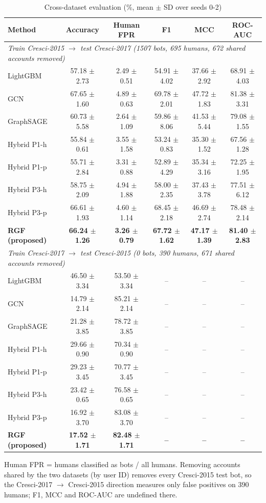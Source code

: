 \begin{table}[!t]
\caption{Cross-dataset evaluation (\%, mean $\pm$ SD over seeds 0-2)}
\label{tab:cross_dataset}
\centering\footnotesize
\setlength{\tabcolsep}{3pt}
\begin{tabular}{lccccc}
\hline
Method & Accuracy & Human FPR & F1 & MCC & ROC-AUC \\
\hline
\multicolumn{6}{l}{\textit{Train Cresci-2015 $\rightarrow$ test Cresci-2017 (1507 bots, 695 humans, 672 shared accounts removed)}} \\
LightGBM & 57.18 $\pm$ 2.73 & 2.49 $\pm$ 0.51 & 54.91 $\pm$ 4.02 & 37.66 $\pm$ 2.92 & 68.91 $\pm$ 4.03 \\
GCN & 67.65 $\pm$ 1.60 & 4.89 $\pm$ 0.63 & 69.78 $\pm$ 2.01 & 47.72 $\pm$ 1.83 & 81.38 $\pm$ 3.31 \\
GraphSAGE & 60.73 $\pm$ 5.58 & 2.64 $\pm$ 1.09 & 59.86 $\pm$ 8.06 & 41.53 $\pm$ 5.44 & 79.08 $\pm$ 1.55 \\
Hybrid P1-h & 55.84 $\pm$ 0.61 & 3.55 $\pm$ 1.58 & 53.24 $\pm$ 0.83 & 35.30 $\pm$ 1.52 & 67.56 $\pm$ 1.28 \\
Hybrid P1-p & 55.71 $\pm$ 2.84 & 3.31 $\pm$ 0.88 & 52.89 $\pm$ 4.29 & 35.34 $\pm$ 3.16 & 72.25 $\pm$ 1.95 \\
Hybrid P3-h & 58.75 $\pm$ 2.09 & 4.94 $\pm$ 1.88 & 58.00 $\pm$ 2.35 & 37.43 $\pm$ 3.78 & 77.51 $\pm$ 6.12 \\
Hybrid P3-p & 66.61 $\pm$ 1.93 & 4.60 $\pm$ 1.14 & 68.45 $\pm$ 2.18 & 46.69 $\pm$ 2.74 & 78.48 $\pm$ 2.14 \\
\textbf{RGF (proposed)} & \textbf{66.24 $\pm$ 1.26} & \textbf{3.26 $\pm$ 0.79} & \textbf{67.72 $\pm$ 1.62} & \textbf{47.17 $\pm$ 1.39} & \textbf{81.40 $\pm$ 2.83} \\
\multicolumn{6}{l}{\textit{Train Cresci-2017 $\rightarrow$ test Cresci-2015 (0 bots, 390 humans, 671 shared accounts removed)}} \\
LightGBM & 46.50 $\pm$ 3.34 & 53.50 $\pm$ 3.34 & -- & -- & -- \\
GCN & 14.79 $\pm$ 2.14 & 85.21 $\pm$ 2.14 & -- & -- & -- \\
GraphSAGE & 21.28 $\pm$ 3.85 & 78.72 $\pm$ 3.85 & -- & -- & -- \\
Hybrid P1-h & 29.66 $\pm$ 0.90 & 70.34 $\pm$ 0.90 & -- & -- & -- \\
Hybrid P1-p & 29.23 $\pm$ 3.45 & 70.77 $\pm$ 3.45 & -- & -- & -- \\
Hybrid P3-h & 23.42 $\pm$ 0.65 & 76.58 $\pm$ 0.65 & -- & -- & -- \\
Hybrid P3-p & 16.92 $\pm$ 3.70 & 83.08 $\pm$ 3.70 & -- & -- & -- \\
\textbf{RGF (proposed)} & \textbf{17.52 $\pm$ 1.71} & \textbf{82.48 $\pm$ 1.71} & \textbf{--} & \textbf{--} & \textbf{--} \\
\hline
\end{tabular}
\par\smallskip\parbox{\linewidth}{\scriptsize Human FPR = humans classified as bots / all humans. Removing accounts shared by the two datasets (by user ID) removes every Cresci-2015 test bot, so the Cresci-2017 $\rightarrow$ Cresci-2015 direction measures only false positives on 390 humans; F1, MCC and ROC-AUC are undefined there.}
\end{table}